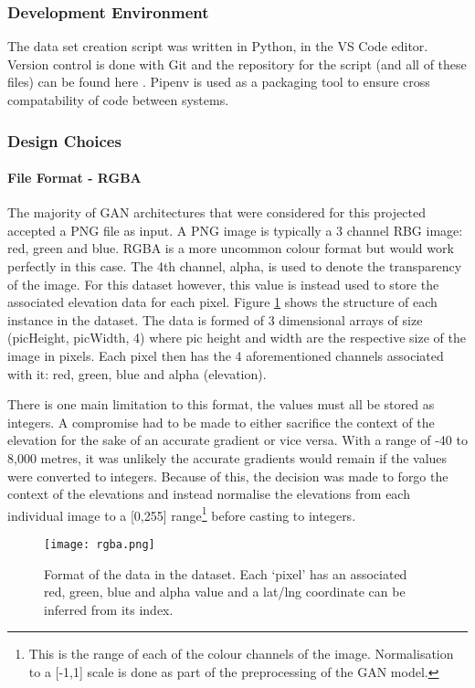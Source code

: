 \documentclass[a4paper]{report}
\begin{document}
\subsubsection{Development Environment}
The data set creation script was written in Python, in the VS Code editor. Version control is done with Git and the repository for the script (and all of these files) can be found here \cite{github}. Pipenv is used as a packaging tool to ensure cross compatability of code between systems.

\subsubsection{Design Choices}
\paragraph{File Format - RGBA}
The majority of GAN architectures that were considered for this projected accepted a PNG file as input. A PNG image is typically a 3 channel RBG image: red, green and blue. RGBA is a more uncommon colour format but would work perfectly in this case. The 4th channel, alpha, is used to denote the transparency of the image. For this dataset however, this value is instead used to store the associated elevation data for each pixel. Figure \ref{fig:rgba} shows the structure of each instance in the dataset. The data is formed of 3 dimensional arrays of size (picHeight, picWidth, 4) where pic height and width are the respective size of the image in pixels. Each pixel then has the 4 aforementioned channels associated with it: red, green, blue and alpha (elevation).

There is one main limitation to this format, the values must all be stored as integers. A compromise had to be made to either sacrifice the context of the elevation for the sake of an accurate gradient or vice versa. With a range of -40 to 8,000 metres, it was unlikely the accurate gradients would remain if the values were converted to integers. Because of this, the decision was made to forgo the context of the elevations and instead normalise the elevations from each individual image to a [0,255] range\footnote{This is the range of each of the colour channels of the image. Normalisation to a [-1,1] scale is done as part of the preprocessing of the GAN model.} before casting to integers.

\begin{figure}[H]
    \centering
        \texttt{[image: rgba.png]}
        \caption{Format of the data in the dataset. Each `pixel' has an associated red, green, blue and alpha value and a lat/lng coordinate can be inferred from its index.}
        \label{fig:rgba}
\end{figure}
\end{document}
